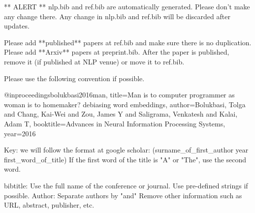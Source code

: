 ** ALERT ** nlp.bib and ref.bib are automatically generated. 
Please don't make any change there. Any change in nlp.bib and ref.bib will be discarded after updates. 


Please add **published** papers at ref.bib and make sure there is no duplication. 
Please add **Arxiv** papers at preprint.bib. After the paper is published, remove it (if published at NLP venue) or move it to ref.bib. 

Please use the following convention if possible.

@inproceedings{bolukbasi2016man,
  title={Man is to computer programmer as woman is to homemaker? debiasing word embeddings},
  author={Bolukbasi, Tolga and Chang, Kai-Wei and Zou, James Y and Saligrama, Venkatesh and Kalai, Adam T},
  booktitle={Advances in Neural Information Processing Systems},
  year={2016}
}

Key: we will follow the format at google scholar: (surname_of_first_author year first_word_of_title) If the first word of the title is "A" or "The", use the second word. 

bibtitle: Use the full name of the conference or journal. Use pre-defined strings if possible. 
Author: Separate authors by "and"
Remove other information such as URL, abstract, publisher, etc. 

